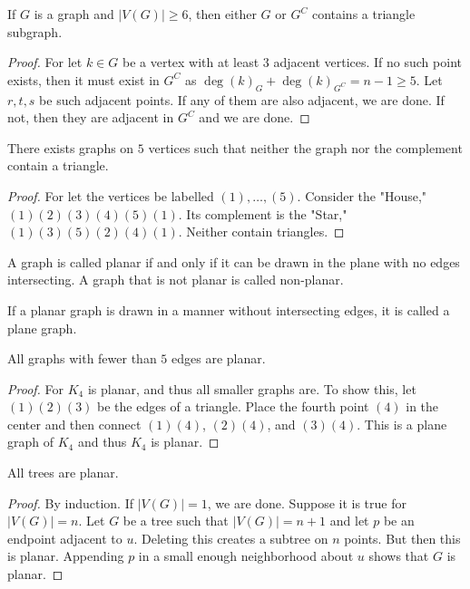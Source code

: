 \documentclass[crop=false,class=book]{standalone}
\begin{document}
\begin{corollary}
If $G$ is a graph and $|V(G)|\geq 6$, then either $G$ or $G^C$ contains a triangle subgraph.
\end{corollary}
\begin{proof}
For let $k\in G$ be a vertex with at least $3$ adjacent vertices. If no such point exists, then it must exist in $G^C$ as $\deg(k)_G+\deg(k)_{G^C} = n-1 \geq 5$. Let $r,t,s$ be such adjacent points. If any of them are also adjacent, we are done. If not, then they are adjacent in $G^C$ and we are done.
\end{proof}
\begin{theorem}
There exists graphs on $5$ vertices such that neither the graph nor the complement contain a triangle.
\end{theorem}
\begin{proof}
For let the vertices be labelled $(1),\hdots,(5)$. Consider the "House," $(1)(2)(3)(4)(5)(1)$. Its complement is the "Star," $(1)(3)(5)(2)(4)(1)$. Neither contain triangles.
\end{proof}
\begin{definition}
A graph is called planar if and only if it can be drawn in the plane with no edges intersecting. A graph that is not planar is called non-planar.
\end{definition}
\begin{definition}
If a planar graph is drawn in a manner without intersecting edges, it is called a plane graph.
\end{definition}
\begin{corollary}
All graphs with fewer than $5$ edges are planar.
\end{corollary}
\begin{proof}
For $K_4$ is planar, and thus all smaller graphs are. To show this, let $(1)(2)(3)$ be the edges of a triangle. Place the fourth point $(4)$ in the center and then connect $(1)(4)$, $(2)(4)$, and $(3)(4)$. This is a plane graph of $K_4$ and thus $K_4$ is planar.
\end{proof}
\begin{theorem}
All trees are planar.
\end{theorem}
\begin{proof}
By induction. If $|V(G)| = 1$, we are done. Suppose it is true for $|V(G)| = n$. Let $G$ be a tree such that $|V(G)| = n+1$ and let $p$ be an endpoint adjacent to $u$. Deleting this creates a subtree on $n$ points. But then this is planar. Appending $p$ in a small enough neighborhood about $u$ shows that $G$ is planar.
\end{proof}
\end{document}
